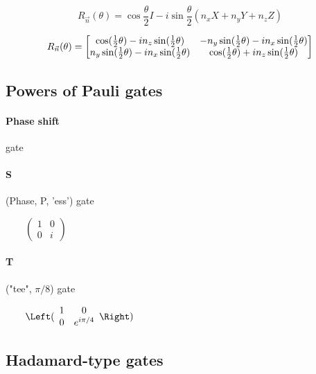 \documentclass[article,pagebackref]{bespoke5}
\begin{document}
\[
R_{\vec{n}}(\theta) = \cos \frac{\theta}{2} I - i \sin\frac{\theta}{2}(n_x X+ n_y Y + n_z Z)
\]


\[
R_{\vec{n}}(\theta) =
\begin{bmatrix*}
	\cos(\half\theta) - i n_z \sin(\half\theta)  &
	- n_y \sin(\half\theta)-i n_x \sin(\half\theta)  \\
	n_y \sin(\half\theta)-i n_x \sin(\half\theta)   & 
	\cos(\half\theta) + i n_z \sin(\half\theta)
\end{bmatrix*}
\]



\subsection{Powers of Pauli gates}

\paragraph{Phase shift} gate


\paragraph{S} (Phase, P, 'ess') gate

\begin{center}

%
$\qquad\left(\begin{array}{rr}1 & 0 \\ 0 & i \end{array}\right)$
\end{center}

\paragraph{T} ("tee", $\pi/8$) gate

\begin{center}

%
$\qquad\Left(\begin{array}{cc}1 & 0 \\ 0 & e^{i \pi/4} \end{array}\Right)$
\end{center}




\subsection{Hadamard-type gates}
\end{document}
